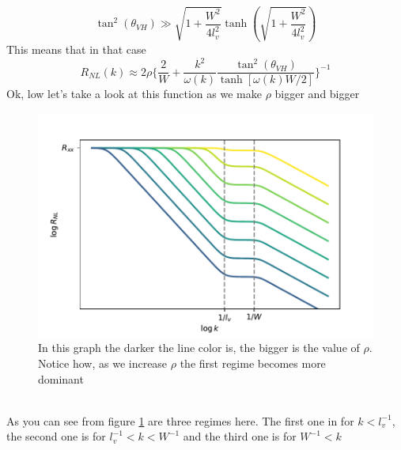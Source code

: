 \begin{equation}
    \tan^2(\theta_{VH})\gg \sqrt{1+\frac {W^2}{4l_v^2}}\tanh\left(\sqrt{1+\frac {W^2}{4l_v^2}}\right)
    \label{eq:highrhocond}
\end{equation}
This means that in that case
\begin{equation}
     R_{NL}(k)\approx 2\rho
    \bigg\{
        \frac 2W+ \frac {k^2}{\omega(k)}\frac{\tan^2(\theta_{VH})}{\tanh[\omega(k)W/2]}    
    \bigg\}^{-1}
    \label{eq:rhotoinf}
\end{equation}
Ok, low let's take a look at this function as we make $\rho$ bigger and bigger
\begin{figure}[h!]
    \centering
    \includegraphics[width=\linewidth]{Immagini/rnl/rho2.pdf}
    \caption{In this graph the darker the line color is, the bigger is the value of $\rho$. Notice how, as we increase $\rho$ the first regime becomes more dominant}
    \label{fig:rho2}
\end{figure}\\

As you can see from figure \ref{fig:rho2} are three regimes here. The first one in for $k<l_v^{-1}$, the second one is for $l_v^{-1}<k<W^{-1}$ and the third one is for $W^{-1}<k$
